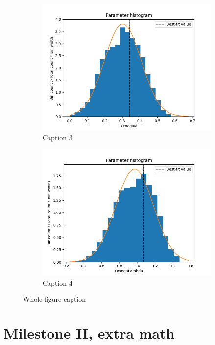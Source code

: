 \begin{appendix}
\begin{figure}[h!tb]
\begin{subfigure}[b!]{0.4\textwidth}
    \centering
    \includegraphics[width=1.0\textwidth]{../Milestone 1/Plots/OmegaM_histogram.png}
    \caption{Caption 3}
    \label{fig:milestone_1_OmegaM_histogram}
    \end{subfigure}
    \begin{subfigure}[b!]{0.4\textwidth}
    \centering
    \includegraphics[width=1.0\textwidth]{../Milestone 1/Plots/OmegaLambda_histogram.png}
    \caption{Caption 4}
    \label{fig:milestone_1_OmegaLambda_histogram}
    \end{subfigure}
\caption{Whole figure caption}
\label{fig:milestone_1_appendix_histograms}
\end{figure}

\FloatBarrier
\section{Milestone II, extra math}



\end{appendix}
